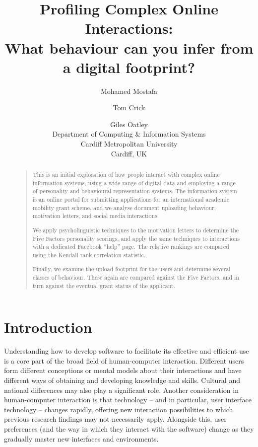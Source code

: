 \documentclass[letterpaper]{article}
\begin{document}
\title{Profiling Complex Online Interactions:\\What behaviour can you infer from a digital footprint?}
\author{Mohamed Mostafa \and Tom Crick \and Giles Oatley\\
Department of Computing \& Information Systems\\
Cardiff Metropolitan University\\
Cardiff, UK
}

\maketitle

\begin{abstract}
\begin{quote}
This is an initial exploration of how people interact with complex
online information systems, using a wide range of digital data and
employing a range of personality and behavioural representation
systems. The information system is an online portal for submitting
applications for an international academic mobility grant scheme, and
we analyse document uploading behaviour, motivation letters, and
social media interactions.

We apply psycholinguistic techniques to the motivation letters to
determine the Five Factors personality scorings, and apply the same
techniques to interactions with a dedicated Facebook ``help''
page. The relative rankings are compared using the Kendall rank
correlation statistic.

Finally, we examine the upload footprint for the users and determine
several classes of behaviour. These again are compared against the
Five Factors, and in turn against the eventual grant status of the
applicant.
\end{quote}
\end{abstract}


\section{Introduction}

Understanding how to develop software to facilitate its effective and
efficient use is a core part of the broad field of human-computer
interaction. Different users form different conceptions or mental
models about their interactions and have different ways of obtaining
and developing knowledge and skills. Cultural and national differences
may also play a significant role. Another consideration in
human-computer interaction is that technology -- and in particular,
user interface technology -- changes rapidly, offering new interaction
possibilities to which previous research findings may not necessarily
apply. Alongside this, user preferences (and the way in which they
interact with the software) change as they gradually master new
interfaces and environments.
\end{document}
